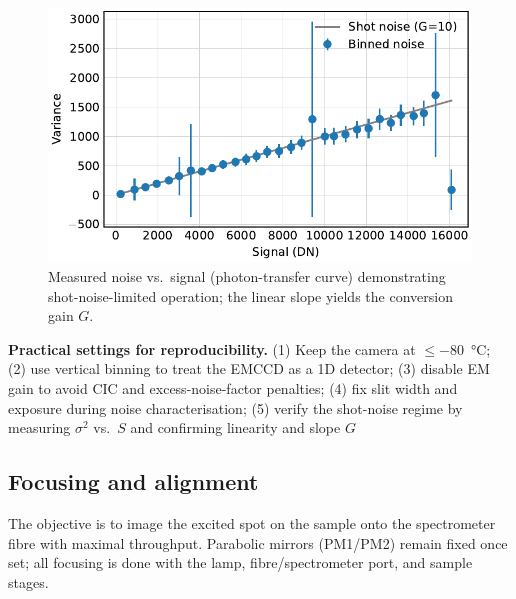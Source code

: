 \documentclass[
	parskip=half,
	a4paper,
]{scrarticle}
\begin{document}
\begin{figure}
    \centering
    \includegraphics{../analysis/figures/shot noise.pdf}
    \caption{Measured noise vs.\ signal (photon-transfer curve) demonstrating shot-noise-limited operation; the linear slope yields the conversion gain \(G\).}
    \label{fig:shotnoise}
\end{figure}

\textbf{Practical settings for reproducibility.}
(1) Keep the camera at \(\leq\)\SI{-80}{\degreeCelsius}; (2) use vertical binning to treat the EMCCD as a 1D detector; (3) disable EM gain to avoid CIC and excess-noise-factor penalties; (4) fix slit width and exposure during noise characterisation; (5) verify the shot-noise regime by measuring \(\sigma^2\) vs.\ \(S\) and confirming linearity and slope \(G\)

\subsection{Focusing and alignment}
The objective is to image the excited spot on the sample onto the spectrometer fibre with maximal throughput. Parabolic mirrors (PM1/PM2) remain fixed once set; all focusing is done with the lamp, fibre/spectrometer port, and sample stages.
\end{document}

